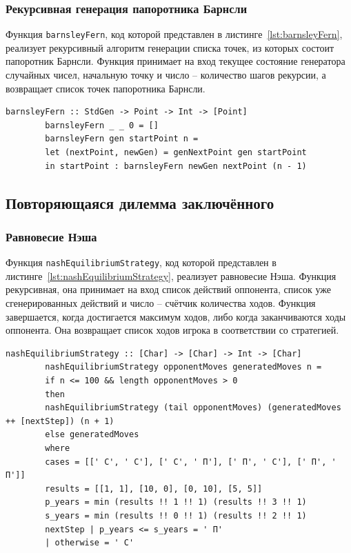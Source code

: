 \documentclass[a4paper, final]{article}
\begin{document}
	\subsubsection{Рекурсивная генерация папоротника Барнсли}
	
	Функция \texttt{barnsleyFern}, код которой представлен в листинге~\ref{lst:barnsleyFern}, реализует рекурсивный алгоритм генерации списка точек, из которых состоит папоротник Барнсли. Функция принимает на вход текущее состояние генератора случайных чисел, начальную точку и число -- количество шагов рекурсии, а возвращает список точек папоротника Барнсли.
	
	\begin{lstlisting}[caption={Код функции для построения папоротника Барнсли.}, label={lst:barnsleyFern}]
		barnsleyFern :: StdGen -> Point -> Int -> [Point]
		barnsleyFern _ _ 0 = []
		barnsleyFern gen startPoint n =
		let (nextPoint, newGen) = genNextPoint gen startPoint
		in startPoint : barnsleyFern newGen nextPoint (n - 1)        
	\end{lstlisting}
	
	
	\subsection{Повторяющаяся дилемма заключённого}
	\subsubsection{Равновесие Нэша}
	
	Функция \texttt{nashEquilibriumStrategy}, код которой представлен в листинге~\ref{lst:nashEquilibriumStrategy}, реализует равновесие Нэша. Функция рекурсивная, она принимает на вход список действий оппонента, список уже сгенерированных действий и число -- счётчик количества ходов. Функция завершается, когда достигается максимум ходов, либо когда заканчиваются ходы оппонента. Она возвращает список ходов игрока в соответствии со стратегией.
	
	
	\begin{lstlisting}[caption={Код функции, резализующей стратегию в соответствии с равновесием Нэша.}, label={lst:nashEquilibriumStrategy}]
		nashEquilibriumStrategy :: [Char] -> [Char] -> Int -> [Char]
		nashEquilibriumStrategy opponentMoves generatedMoves n =
		if n <= 100 && length opponentMoves > 0
		then
		nashEquilibriumStrategy (tail opponentMoves) (generatedMoves ++ [nextStep]) (n + 1)
		else generatedMoves
		where
		cases = [[' С', ' С'], [' С', ' П'], [' П', ' С'], [' П', ' П']]
		results = [[1, 1], [10, 0], [0, 10], [5, 5]]
		p_years = min (results !! 1 !! 1) (results !! 3 !! 1)
		s_years = min (results !! 0 !! 1) (results !! 2 !! 1)
		nextStep | p_years <= s_years = ' П'
		| otherwise = ' С'
	\end{lstlisting}
	
\end{document}
